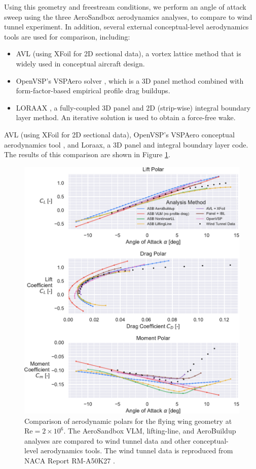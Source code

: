 Using this geometry and freestream conditions, we perform an angle of attack sweep using the three AeroSandbox aerodynamics analyses, to compare to wind tunnel experiment. In addition, several external conceptual-level aerodynamics tools are used for comparison, including:
\begin{itemize}[noitemsep]
    \item AVL \cite{avl} (using XFoil \cite{drela_xfoil_1989} for 2D sectional data), a vortex lattice method that is widely used in conceptual aircraft design.
    \item OpenVSP's VSPAero solver \cite{mcdonald_open_2022}, which is a 3D panel method combined with form-factor-based empirical profile drag buildups.
    \item LORAAX \cite{loraax}, a fully-coupled 3D panel and 2D (strip-wise) integral boundary layer method. An iterative solution is used to obtain a force-free wake.
\end{itemize}

AVL \cite{avl} (using XFoil \cite{drela_xfoil_1989} for 2D sectional data), OpenVSP's VSPAero conceptual aerodynamics tool \cite{mcdonald_open_2022}, and Loraax, a 3D panel and integral boundary layer code. The results of this comparison are shown in Figure \ref{fig:fw_results}.

\begin{figure}[!htb]
    \centering
    \includegraphics[width=\textwidth]{../figures/aero_validation/flying_wing_polars-crop.pdf}
    \caption{Comparison of aerodynamic polars for the flying wing geometry at $\text{Re}=2 \times 10^6$. The AeroSandbox VLM, lifting-line, and AeroBuildup analyses are compared to wind tunnel data and other conceptual-level aerodynamics tools. The wind tunnel data is reproduced from NACA Report RM-A50K27 \cite{tinling_effects_1951}.}
    \label{fig:fw_results}
\end{figure}

